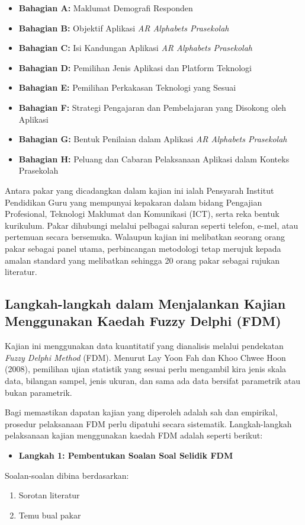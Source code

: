 \begin{itemize}
\begin{itemize}
  \item \textbf{Bahagian A:} Maklumat Demografi Responden
  \item \textbf{Bahagian B:} Objektif Aplikasi \textit{AR Alphabets Prasekolah}
  \item \textbf{Bahagian C:} Isi Kandungan Aplikasi \textit{AR Alphabets Prasekolah}
  \item \textbf{Bahagian D:} Pemilihan Jenis Aplikasi dan Platform Teknologi
  \item \textbf{Bahagian E:} Pemilihan Perkakasan Teknologi yang Sesuai
  \item \textbf{Bahagian F:} Strategi Pengajaran dan Pembelajaran yang Disokong oleh Aplikasi
  \item \textbf{Bahagian G:} Bentuk Penilaian dalam Aplikasi \textit{AR Alphabets Prasekolah}
  \item \textbf{Bahagian H:} Peluang dan Cabaran Pelaksanaan Aplikasi dalam Konteks Prasekolah
\end{itemize}
Antara pakar yang dicadangkan dalam kajian ini ialah Pensyarah Institut Pendidikan Guru yang mempunyai kepakaran dalam bidang Pengajian Profesional, Teknologi Maklumat dan Komunikasi (ICT), serta reka bentuk kurikulum. Pakar dihubungi melalui pelbagai saluran seperti telefon, e-mel, atau pertemuan secara bersemuka. Walaupun kajian ini melibatkan seorang  orang pakar sebagai panel utama, perbincangan metodologi tetap merujuk kepada amalan standard yang melibatkan sehingga 20 orang pakar sebagai rujukan literatur.

\subsection{Langkah-langkah dalam Menjalankan Kajian Menggunakan Kaedah Fuzzy Delphi (FDM)}

Kajian ini menggunakan data kuantitatif yang dianalisis melalui pendekatan \textit{Fuzzy Delphi Method} (FDM). Menurut Lay Yoon Fah dan Khoo Chwee Hoon (2008), pemilihan ujian statistik yang sesuai perlu mengambil kira jenis skala data, bilangan sampel, jenis ukuran, dan sama ada data bersifat parametrik atau bukan parametrik.

Bagi memastikan dapatan kajian yang diperoleh adalah sah dan empirikal, prosedur pelaksanaan FDM perlu dipatuhi secara sistematik. Langkah-langkah pelaksanaan kajian menggunakan kaedah FDM adalah seperti berikut:

\begin{itemize}
  \item \textbf{Langkah 1: Pembentukan Soalan Soal Selidik FDM} \\
  \end{itemize}
  Soalan-soalan dibina berdasarkan:
  \begin{enumerate}[label*=\roman*.]
    \item Sorotan literatur
    \item Temu bual pakar

\end{enumerate}
\end{itemize}
